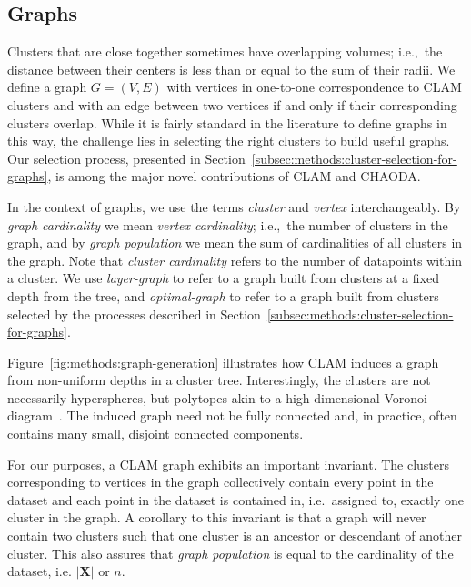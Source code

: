 \subsection{Graphs}
\label{subsec:methods:graphs}

Clusters that are close together sometimes have overlapping volumes; i.e.,\ the distance between their centers is less than or equal to the sum of their radii.
We define a graph $G=(V,E)$ with vertices in one-to-one correspondence to CLAM clusters and with an edge between two vertices if and only if their corresponding clusters overlap.
While it is fairly standard in the literature to define graphs in this way, the challenge lies in selecting the right clusters to build useful graphs.
Our selection process, presented in Section~\ref{subsec:methods:cluster-selection-for-graphs}, is among the major novel contributions of CLAM and CHAODA.

In the context of graphs, we use the terms \textit{cluster} and \textit{vertex} interchangeably.
By \textit{graph cardinality} we mean \textit{vertex cardinality}; i.e.,\ the number of clusters in the graph, and by \textit{graph population} we mean the sum of cardinalities of all clusters in the graph.
Note that \textit{cluster cardinality} refers to the number of datapoints within a cluster.
We use \textit{layer-graph} to refer to a graph built from clusters at a fixed depth from the tree, and \textit{optimal-graph} to refer to a graph built from clusters selected by the processes described in Section~\ref{subsec:methods:cluster-selection-for-graphs}.

Figure~\ref{fig:methods:graph-generation} illustrates how CLAM induces a graph from non-uniform depths in a cluster tree.
Interestingly, the clusters are not necessarily hyperspheres, but polytopes akin to a high-dimensional Voronoi diagram~\cite{voronoi1908nouvelles}.
The induced graph need not be fully connected and, in practice, often contains many small, disjoint connected components.

For our purposes, a CLAM graph exhibits an important invariant.
The clusters corresponding to vertices in the graph collectively contain every point in the dataset and each point in the dataset is contained in, i.e.\ assigned to, exactly one cluster in the graph.
A corollary to this invariant is that a graph will never contain two clusters such that one cluster is an ancestor or descendant of another cluster.
This also assures that \textit{graph population} is equal to the cardinality of the dataset, i.e. $|\textbf{X}|$ or $n$.

